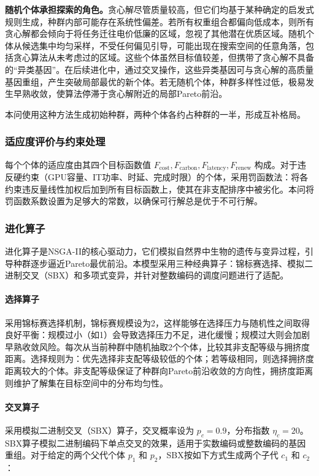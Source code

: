 \documentclass[UTF8,a4paper,zihao=-4]{ctexart}
\begin{document}
\textbf{随机个体承担探索的角色。}贪心解尽管质量较高，但它们均基于某种确定的启发式规则生成，种群内部可能存在系统性偏差。若所有权重组合都偏向低成本，则所有贪心解都会倾向于将任务迁往电价低廉的区域，忽视了其他潜在优质区域。随机个体从候选集中均匀采样，不受任何偏见引导，可能出现在搜索空间的任意角落，包括贪心算法从未考虑过的区域。这些个体虽然目标值较差，但携带了贪心解不具备的“异类基因”。在后续进化中，通过交叉操作，这些异类基因可与贪心解的高质量基因重组，产生突破局部最优的新个体。若无随机个体，种群多样性过低，极易发生早熟收敛，使算法停滞于贪心解附近的局部Pareto前沿。

本问使用这种方法生成初始种群，两种个体各约占种群的一半，形成互补格局。



\subsubsection{适应度评价与约束处理}

每个个体的适应度由其四个目标函数值 $F_{\text{cost}}, F_{\text{carbon}}, F_{\text{latency}}, F_{\text{renew}}$ 构成。对于违反硬约束（GPU容量、IT功率、时延、完成时限）的个体，采用罚函数法：将各约束违反量线性加权后加到所有目标函数上，使其在非支配排序中被劣化。本问将罚函数系数设置为足够大的常数，以确保可行解总是优于不可行解。

\subsubsection{进化算子}

进化算子是NSGA-II的核心驱动力，它们模拟自然界中生物的遗传与变异过程，引导种群逐步逼近Pareto最优前沿。本模型采用三种经典算子：锦标赛选择、模拟二进制交叉（SBX）和多项式变异，并针对整数编码的调度问题进行了适配。

\paragraph{选择算子}
采用锦标赛选择机制，锦标赛规模设为2，这样能够在选择压力与随机性之间取得良好平衡：规模过小（如1）会导致选择压力不足，进化缓慢；规模过大则会加剧早熟收敛风险。每次从当前种群中随机抽取2个个体，比较其非支配等级与拥挤度距离。选择规则为：优先选择非支配等级较低的个体；若等级相同，则选择拥挤度距离较大的个体。非支配等级保证了种群向Pareto前沿收敛的方向性，拥挤度距离则维护了解集在目标空间中的分布均匀性。

\paragraph{交叉算子}
采用模拟二进制交叉（SBX）算子，交叉概率设为 $p_c = 0.9$，分布指数 $\eta_c = 20$。SBX算子模拟二进制编码下单点交叉的效果，适用于实数编码或整数编码的基因重组。对于给定的两个父代个体 $p_1$ 和 $p_2$，SBX按如下方式生成两个子代 $c_1$ 和 $c_2$：
\end{document}
